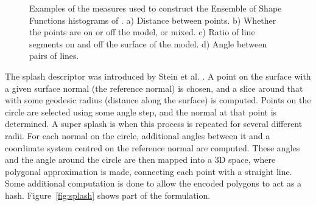 \documentclass[10pt,a4paper]{article}
\begin{document}
\begin{figure}
  \centering
  \caption{Examples of the measures used to construct the Ensemble of Shape
    Functions histograms of \cite{wohlkinger2011ensemble}. a) Distance between
    points. b) Whether the points are on or off the model, or mixed. c) Ratio of
  line segments on and off the surface of the model. d) Angle between pairs of lines.}
  \label{fig:wohlESF}
\end{figure}

The splash descriptor was introduced by Stein et al. \cite{stein1992structural}.
A point on the surface with a given surface normal (the reference normal) is
chosen, and a slice around that with some geodesic radius (distance along the
surface) is computed. Points on the circle are selected using some angle step,
and the normal at that point is determined. A super splash is when this process
is repeated for several different radii. For each normal on the circle,
additional angles between it and a coordinate system centred on the reference
normal are computed. These angles and the angle around the circle are then
mapped into a 3D space, where polygonal approximation is made, connecting each
point with a straight line. Some additional computation is done to allow the
encoded polygons to act as a hash. Figure~\ref{fig:splash} shows part of the
formulation.
\end{document}
